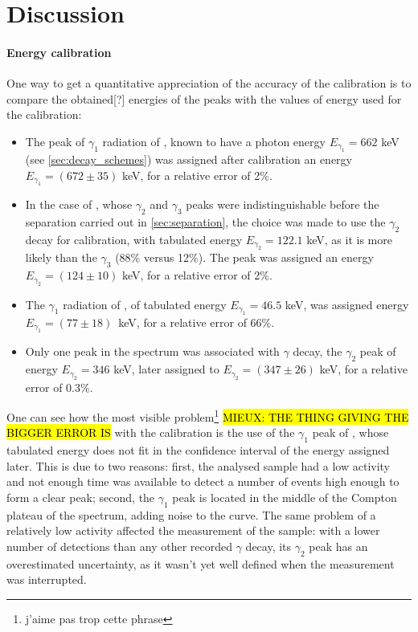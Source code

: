 \section{Discussion}
\paragraph{Energy calibration}

One way to get a quantitative appreciation of the accuracy of the calibration is to compare the obtained[?] energies of the peaks with the values of energy used for the calibration:
\begin{itemize}
    \item The peak of $\gamma_1$ radiation of \cesium, known to have a photon energy $E_{\gamma_1} = 662$ keV (see \autoref{sec:decay_schemes}) was assigned after calibration an energy $E_{\gamma_1} = (672 \pm 35)$ keV, for a relative error of 2\%.
    \item In the case of \cobalt, whose $\gamma_2$ and $\gamma_3$ peaks were indistinguishable before the separation carried out in \autoref{sec:separation},
    the choice was made to use the $\gamma_2$ decay for calibration, with tabulated energy $E_{\gamma_2} = 122.1$ keV, as it is more likely than the $\gamma_3$ (88\% versus 12\%).
    The peak was assigned an energy $E_{\gamma_2} = (124 \pm 10)$ keV, for a relative error of 2\%.
    \item The $\gamma_1$ radiation of \lead, of tabulated energy $E_{\gamma_1} = 46.5$ keV, was assigned energy \mbox{$E_{\gamma_1} = (77 \pm 18)$ keV}, for a relative error of 66\%.
    \item Only one peak in the \hafnium spectrum was associated with $\gamma$ decay, the $\gamma_2$ peak of energy $E_{\gamma_2} = 346$ keV, later assigned to $E_{\gamma_2} = (347 \pm 26)$ keV, for a relative error of 0.3\%.
\end{itemize}
One can see how the most visible problem\footnote{j'aime pas trop cette phrase} \hl{MIEUX: THE THING GIVING THE BIGGER ERROR IS} with the calibration is the use of the $\gamma_1$ peak of \lead, whose tabulated energy does not fit in the confidence interval of the energy assigned later.
This is due to two reasons: first, the analysed sample had a low activity and not enough time was available to detect a number of events high enough to form a clear peak;
second, the $\gamma_1$ peak is located in the middle of the Compton plateau of the spectrum, adding noise to the curve.
The same problem of a relatively low activity affected the measurement of the \hafnium sample:
with a lower number of detections than any other recorded $\gamma$ decay, its $\gamma_2$ peak has an overestimated uncertainty, as it wasn't yet well defined when the measurement was interrupted.

